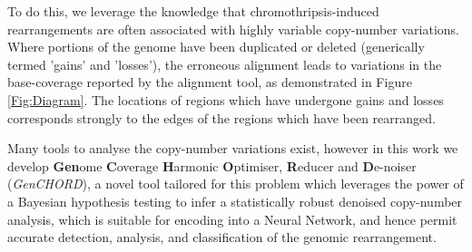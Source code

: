 \documentclass[fleqn,usenatbib]{acmart}
\def\codename{\textit{GenCHORD}}
\begin{document}
		To do this, we leverage the knowledge that chromothripsis-induced rearrangements are often associated with highly variable copy-number variations\cite{Ijaz2024,Chromo2011}. Where portions of the genome have been duplicated or deleted (generically termed 'gains' and 'losses'), the erroneous alignment leads to variations in the base-coverage reported by the alignment tool, as demonstrated in Figure \ref{Fig:Diagram}. {The locations of regions which have undergone gains and losses corresponds strongly to the edges of the regions which have been rearranged.}

		Many tools to analyse the copy-number variations exist, however in this work we develop \textbf{Gen}ome \textbf{C}overage \textbf{H}armonic \textbf{O}ptimiser, \textbf{R}educer and \textbf{D}e-noiser (\codename{}), a novel tool tailored for this problem which leverages the power of a Bayesian hypothesis testing to infer a statistically robust denoised copy-number analysis, which is suitable for encoding into a Neural Network, and hence permit accurate detection, analysis, and classification of the genomic rearrangement.
\end{document}
